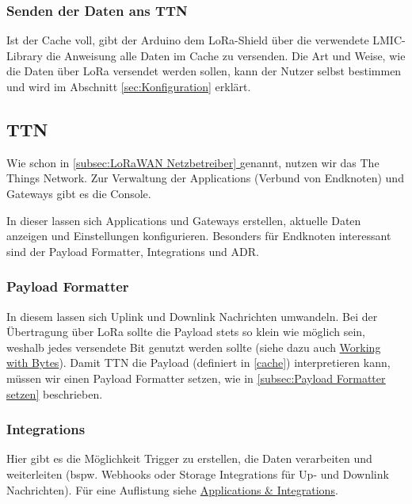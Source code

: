 \documentclass[12pt]{article}
\newcommand*{\fullref}[1]{\hyperref[{#1}]{\ref{#1} \nameref{#1}}}   %
\begin{document}
      \subsubsection{Senden der Daten ans TTN}
      Ist der Cache voll, gibt der Arduino dem LoRa-Shield über die verwendete LMIC-Library die Anweisung alle Daten im Cache zu versenden.
      Die Art und Weise, wie die Daten über LoRa versendet werden sollen, kann der Nutzer selbst bestimmen und wird im Abschnitt \underline{\ref{sec:Konfiguration}} erklärt.


    \subsection{TTN}
      Wie schon in \underline{\fullref{subsec:LoRaWAN Netzbetreiber}} genannt, nutzen wir das The Things Network.
      Zur Verwaltung der Applications (Verbund von Endknoten) und Gateways gibt es die Console.

      In dieser lassen sich Applications und Gateways erstellen, aktuelle Daten anzeigen und Einstellungen konfigurieren.
      Besonders für Endknoten interessant sind der Payload Formatter, Integrations und ADR.


      \subsubsection{Payload Formatter}          
        In diesem lassen sich Uplink und Downlink Nachrichten umwandeln.
        Bei der Übertragung über LoRa sollte die Payload stets so klein wie möglich sein, weshalb jedes versendete Bit genutzt werden sollte
        (siehe dazu auch \href{https://www.thethingsnetwork.org/docs/devices/bytes/}{Working with Bytes}).
        Damit TTN die Payload (definiert in \underline{\ref{cache}}) interpretieren kann, müssen wir einen Payload Formatter setzen,
        wie in \underline{\ref{subsec:Payload Formatter setzen}} beschrieben.
        


      \subsubsection{Integrations} \label{Integrations}
        Hier gibt es die Möglichkeit Trigger zu erstellen, die Daten verarbeiten und weiterleiten
        (bspw. Webhooks oder Storage Integrations für Up- und Downlink Nachrichten).
        Für eine Auflistung siehe \href{https://www.thethingsnetwork.org/docs/applications-and-integrations/}{Applications \& Integrations}.
\end{document}
